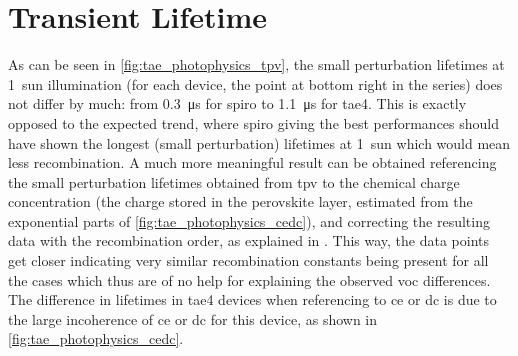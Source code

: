 \section{Transient Lifetime}


	As can be seen in \cref{fig:tae_photophysics_tpv}, the small perturbation lifetimes at \SI{1}{sun} illumination (for each device, the point at bottom right in the series) does not differ by much: from \SI{0.3}{\us} for \gls{spiro} to \SI{1.1}{\us} for \gls{tae4}.
	This is exactly opposed to the expected trend, where \gls{spiro} giving the best performances should have shown the longest (small perturbation) lifetimes at 1~sun which would mean less recombination.
	A much more meaningful result can be obtained referencing the small perturbation lifetimes obtained from \gls{tpv} to the chemical charge concentration (the charge stored in the perovskite layer, estimated from the exponential parts of \cref{fig:tae_photophysics_cedc}), and correcting the resulting data with the recombination order, as explained in .
	This way, the data points get closer indicating very similar recombination constants being present for all the cases which thus are of no help for explaining the observed \gls{voc} differences.
	The difference in lifetimes in \gls{tae4} devices when referencing to \gls{ce} or \gls{dc} is due to the large incoherence of \gls{ce} or \gls{dc} for this device, as shown in \cref{fig:tae_photophysics_cedc}.
	
